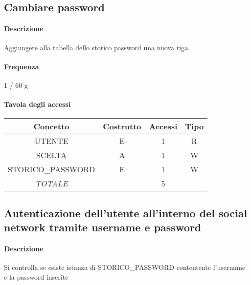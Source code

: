 \documentclass[a4paper,12pt]{report}
\begin{document}
\subsection{Cambiare password} \label{cambio_password}
\paragraph{Descrizione} Aggiungere alla tabella dello storico password una nuova riga. 
\paragraph{Frequenza} 1 / 60 g 
\begin{table}[H]
\paragraph{Tavola degli accessi\newline}
\begin{tabular}{|c|c|c|c|}
\hline
Concetto          & Costrutto & Accessi & Tipo \\ \hline
UTENTE            & E         & 1       & R    \\ \hline
SCELTA            & A         & 1       & W    \\ \hline
STORICO\_PASSWORD & E         & 1       & W    \\ \hline
\textit{TOTALE}   &           & 5       &      \\ \hline
\end{tabular}
\end{table}
\subsection{Autenticazione dell'utente all'interno del social network tramite username e password} \label{autenticazione}
\paragraph{Descrizione} Si controlla se esiste istanza di STORICO\_PASSWORD contentente l'username e la password inserite
\end{document}
